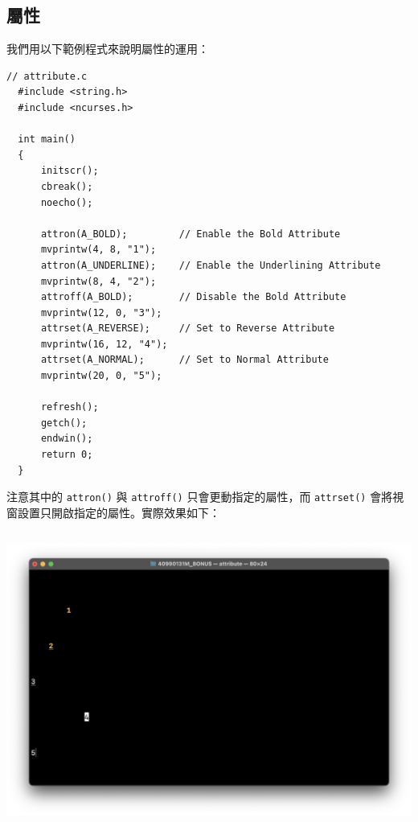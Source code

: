 \documentclass[12pt]{article}
\theoremstyle{definition}
\begin{document}
\subsection{屬性}
\noindent
我們用以下範例程式來說明屬性的運用：
\begin{lstlisting}[style=C]
  // attribute.c
  #include <string.h>
  #include <ncurses.h>

  int main()
  {
      initscr();
      cbreak();
      noecho();
    
      attron(A_BOLD);         // Enable the Bold Attribute
      mvprintw(4, 8, "1");
      attron(A_UNDERLINE);    // Enable the Underlining Attribute
      mvprintw(8, 4, "2");
      attroff(A_BOLD);        // Disable the Bold Attribute
      mvprintw(12, 0, "3");
      attrset(A_REVERSE);     // Set to Reverse Attribute
      mvprintw(16, 12, "4");
      attrset(A_NORMAL);      // Set to Normal Attribute
      mvprintw(20, 0, "5");
    
      refresh();
      getch();
      endwin();
      return 0;
  }
\end{lstlisting}
注意其中的 \texttt{attron()} 與 \texttt{attroff()} 只會更動指定的屬性，而 \texttt{attrset()} 會將視窗設置只開啟指定的屬性。實際效果如下：
\begin{lstlisting}[style=zsh]
  % ./attribute
\end{lstlisting}
\begin{center}
    \includegraphics[width=\textwidth]{attribute.png}
\end{center}
\end{document}

